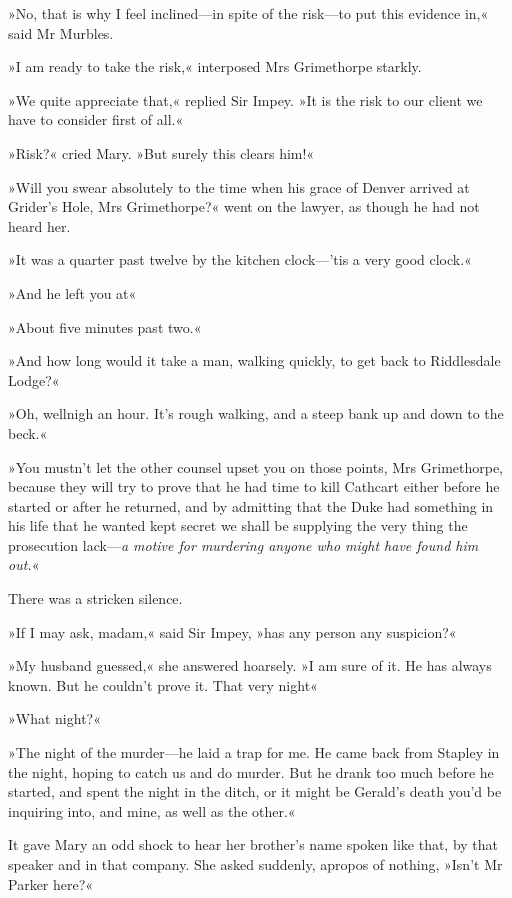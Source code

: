 »No, that is why I feel inclined\allowbreak---\allowbreak in spite of the risk\allowbreak---\allowbreak to put this evidence in,« said Mr Murbles.

»I am ready to take the risk,« interposed Mrs Grimethorpe starkly.

»We quite appreciate that,« replied Sir Impey. »It is the risk to our client we have to consider first of all.«

»Risk?« cried Mary. »But surely this clears him!«

»Will you swear absolutely to the time when his grace of Denver arrived at Grider's Hole, Mrs Grimethorpe?« went on the lawyer, as though he had not heard her.

»It was a quarter past twelve by the kitchen clock---'tis a very good clock.«

»And he left you at\longdash«

»About five minutes past two.«

»And how long would it take a man, walking quickly, to get back to Riddlesdale Lodge?«

»Oh, wellnigh an hour. It's rough walking, and a steep bank up and down to the beck.«

»You mustn't let the other counsel upset you on those points, Mrs Grimethorpe, because they will try to prove that he had time to kill Cathcart either before he started or after he returned, and by admitting that the Duke had something in his life that he wanted kept secret we shall be supplying the very thing the prosecution lack\allowbreak---\allowbreak \textit{a motive for murdering anyone who might have found him out.}«

There was a stricken silence.

»If I may ask, madam,« said Sir Impey, »has any person any suspicion?«

»My husband guessed,« she answered hoarsely. »I am sure of it. He has always known. But he couldn't prove it. That very night\longdash«

»What night?«

»The night of the murder\allowbreak---\allowbreak he laid a trap for me. He came back from Stapley in the night, hoping to catch us and do murder. But he drank too much before he started, and spent the night in the ditch, or it might be Gerald's death you'd be inquiring into, and mine, as well as the other.«

It gave Mary an odd shock to hear her brother's name spoken like that, by that speaker and in that company. She asked suddenly, apropos of nothing, »Isn't Mr Parker here?«

